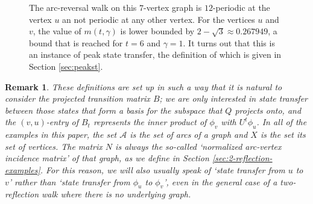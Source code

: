 \documentclass{article}
\newtheorem{remark}[theorem]{Remark}
\numberwithin{equation}{section}
\newcommand\cA{{\mathcal A}}
\begin{document}
\begin{figure}[htb]
\centering
{}
\caption{The arc-reversal walk on this $7$-vertex graph is $12$-periodic at the vertex $u$ an not periodic at any other vertex. For the vertices $u$ and $v$, the value of $m(t,\gamma)$ is lower bounded by $2 - \sqrt{3} \approx 0.267949$, a bound that is reached for $t = 6$ and $\gamma = 1$. It turns out that this is an instance of peak state transfer, the definition of which is given in Section \ref{sec:peakst}.
\label{fig:high_peakST}}
\end{figure}

\begin{remark}
\label{rem:all_examples_have_same_N}
These definitions are set up in such a way that it is natural to consider the projected transition matrix $B$; we are only interested in state transfer between those states that form a basis for the subspace that $Q$ projects onto, and the $(v,u)$-entry of $B_t$ represents the inner product of $\phi_v$ with $U^t\phi_u$. In all of the examples in this paper, the set $\cA$ is the set of arcs of a graph and $X$ is the set its set of vertices. The matrix $N$ is always the so-called `normalized arc-vertex incidence matrix' of that graph, as we define in Section \ref{sec:2-reflection-examples}. For this reason, we will also usually speak of `state transfer from $u$ to $v$' rather than `state transfer from $\phi_{u}$ to $\phi_{v}$', even in the general case of a two-reflection walk where there is no underlying graph.
\end{remark}
\end{document}
